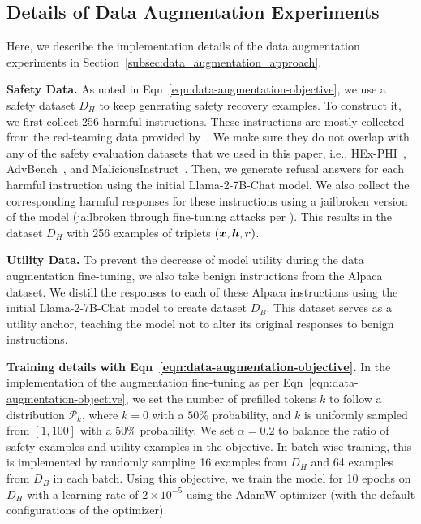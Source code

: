 \subsection{Details of Data Augmentation Experiments}
\label{appendix-subsec:experiment_details-data-augmentation}

Here, we describe the implementation details of the data augmentation experiments in Section~\ref{subsec:data_augmentation_approach}.

\textbf{Safety Data.} As noted in Eqn~\ref{eqn:data-augmentation-objective}, we use a safety dataset $D_H$ to keep generating safety recovery examples. To construct it, we first collect 256 harmful instructions. These instructions are mostly collected from the red-teaming data provided by~\citet{ganguli2022red}. We make sure they do not overlap with any of the safety evaluation datasets that we used in this paper, i.e., HEx-PHI~\cite{hexphi}, AdvBench~\cite{zou2023universal}, and MaliciousInstruct~\cite{huang2023catastrophic}. Then, we generate refusal answers for each harmful instruction using the initial Llama-2-7B-Chat model. We also collect the corresponding harmful responses for these instructions using a jailbroken version of the model (jailbroken through fine-tuning attacks per \citet{qi2023fine}). This results in the dataset $D_H$ with 256 examples of triplets $(\bm{x}, \bm{h}, \bm{r})$.

\textbf{Utility Data.} To prevent the decrease of model utility during the data augmentation fine-tuning, we also take benign instructions from the Alpaca~\cite{alpaca} dataset. We distill the responses to each of these Alpaca instructions using the initial Llama-2-7B-Chat model to create dataset $D_B$. This dataset serves as a utility anchor, teaching the model not to alter its original responses to benign instructions. 

\textbf{Training details with Eqn~\ref{eqn:data-augmentation-objective}.} In the implementation of the augmentation fine-tuning as per Eqn~\ref{eqn:data-augmentation-objective}, we set the number of prefilled tokens $k$ to follow a distribution $\mathcal{P}_k$, where $k=0$ with a $50\%$ probability, and $k$ is uniformly sampled from $[1, 100]$ with a $50\%$ probability. We set $\alpha = 0.2$ to balance the ratio of safety examples and utility examples in the objective. In batch-wise training, this is implemented by randomly sampling 16 examples from $D_H$ and 64 examples from $D_B$ in each batch. Using this objective, we train the model for 10 epochs on $D_H$ with a learning rate of $2\times 10^{-5}$ using the AdamW optimizer (with the default configurations of the optimizer).


